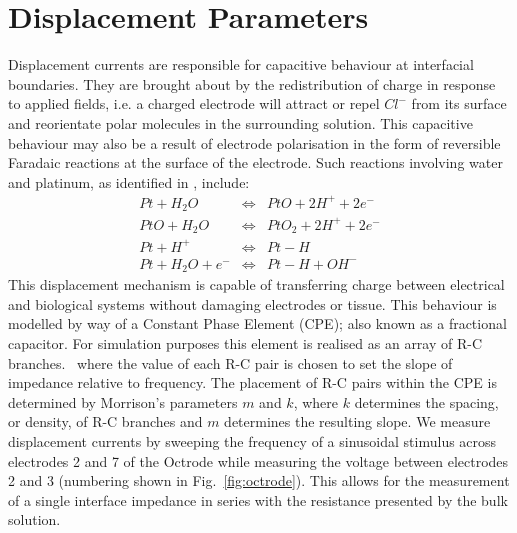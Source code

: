 \documentclass[journal, a4paper]{IEEEtran}
\begin{document}
\section{Displacement Parameters}

{\color{blue} Displacement currents are responsible for capacitive behaviour at interfacial boundaries.
    They are brought about by the redistribution of charge in response to applied fields, i.e. a charged electrode will attract or repel $Cl^{-}$ from its surface and reorientate polar molecules in the surrounding solution.\cite{Merrill05} This capacitive behaviour may also be a result of electrode polarisation in the form of reversible Faradaic reactions at the surface of the electrode.
Such reactions involving water and platinum, as identified in \cite{Horch2004,Mohtashami2011,Merrill05}, include:
\begin{eqnarray}
    Pt + H_{2}O &\Leftrightarrow& PtO + 2 H^{+} + 2 e^{-}\\
    PtO + H_{2}O &\Leftrightarrow& PtO_{2} + 2 H^{+} + 2e^{-}\\
    Pt + H^{+} & \Leftrightarrow & Pt-H\\
    Pt + H_{2}O + e^{-} &\Leftrightarrow& Pt-H+OH^{-}
\end{eqnarray}
This displacement mechanism is capable of transferring charge between electrical and biological systems without damaging electrodes or tissue.\cite{Horch2004}
This behaviour is modelled by way of a Constant Phase Element (CPE); also known as a fractional capacitor.}
{\color{blue} For simulation purposes this element is realised as an array of R-C branches.~\cite{ScottSingle2013,Morrison59,Elwakil10} where the value of each R-C pair is chosen to set the slope of impedance relative to frequency. The placement of R-C pairs within the CPE is determined by Morrison's parameters $m$ and $k$, where $k$ determines the spacing, or density, of R-C branches and $m$ determines the resulting slope.}
We measure displacement currents by sweeping the frequency of a sinusoidal stimulus across electrodes 2 and 7 of the Octrode while measuring the voltage between electrodes 2 and 3 (numbering shown in Fig.~\ref{fig:octrode}).
This allows for the measurement of a single interface impedance in series with the resistance presented by the bulk solution.
\end{document}
